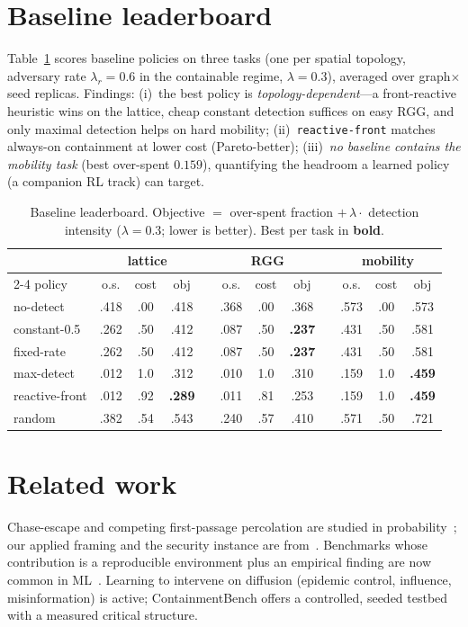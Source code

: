 \documentclass[11pt]{article}
\begin{document}
\section{Baseline leaderboard}
Table~\ref{tab:lb} scores baseline policies on three tasks (one per spatial
topology, adversary rate $\lambda_r=0.6$ in the containable regime, $\lambda=0.3$),
averaged over graph$\times$seed replicas. Findings: (i)~the best policy is
\emph{topology-dependent}---a front-reactive heuristic wins on the lattice, cheap
constant detection suffices on easy RGG, and only maximal detection helps on hard
mobility; (ii)~\texttt{reactive-front} matches always-on containment at lower cost
(Pareto-better); (iii)~\emph{no baseline contains the mobility task} (best over-spent
$0.159$), quantifying the headroom a learned policy (a companion RL track) can target.

\begin{table}[t]\centering\small
\caption{Baseline leaderboard. Objective $=$ over-spent fraction $+\,\lambda\cdot$
detection intensity ($\lambda=0.3$; lower is better). Best per task in \textbf{bold}.}
\label{tab:lb}
\begin{tabular}{@{}l ccc c ccc c ccc@{}}
\toprule
& \multicolumn{3}{c}{\textbf{lattice}} && \multicolumn{3}{c}{\textbf{RGG}} && \multicolumn{3}{c}{\textbf{mobility}}\\
\cmidrule{2-4}\cmidrule{6-8}\cmidrule{10-12}
policy & o.s. & cost & obj && o.s. & cost & obj && o.s. & cost & obj\\
\midrule
no-detect      & .418 & .00 & .418 && .368 & .00 & .368 && .573 & .00 & .573\\
constant-0.5   & .262 & .50 & .412 && .087 & .50 & \textbf{.237} && .431 & .50 & .581\\
fixed-rate     & .262 & .50 & .412 && .087 & .50 & \textbf{.237} && .431 & .50 & .581\\
max-detect     & .012 & 1.0 & .312 && .010 & 1.0 & .310 && .159 & 1.0 & \textbf{.459}\\
reactive-front & .012 & .92 & \textbf{.289} && .011 & .81 & .253 && .159 & 1.0 & \textbf{.459}\\
random         & .382 & .54 & .543 && .240 & .57 & .410 && .571 & .50 & .721\\
\bottomrule
\end{tabular}
\end{table}

\section{Related work}
Chase-escape and competing first-passage percolation are studied in
probability~\cite{chaseescape}; our applied framing and the security instance are
from~\cite{containment}. Benchmarks whose contribution is a reproducible environment
plus an empirical finding are now common in ML~\cite{real}. Learning to intervene on
diffusion (epidemic control, influence, misinformation) is active; ContainmentBench
offers a controlled, seeded testbed with a measured critical structure.
\end{document}
